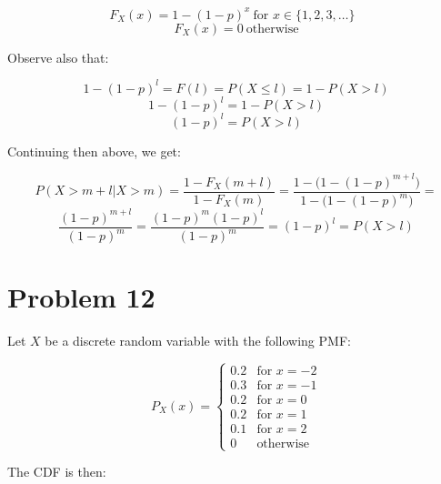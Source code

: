 \documentclass{article}
\begin{document}
\begin{equation*}
    F_{X}(x) = 1 - (1 - p)^{x} \ \mbox{for \(x \in \{1, 2, 3, \dots\}\)  }
\end{equation*}
\begin{equation*}
    F_{X}(x) = 0 \ \mbox{otherwise}
\end{equation*}

Observe also that:

\begin{equation*}
    1 - (1 - p)^{l} = F(l) = P(X \leq l) = 1 - P(X > l)
\end{equation*}
\begin{equation*}
    1 - (1 - p)^{l} = 1 - P(X > l)
\end{equation*}
\begin{equation*}
    (1 - p)^{l} = P(X > l)
\end{equation*}

Continuing then above, we get:

\begin{equation*}
    P(X > m + l | X > m) = \frac{1 - F_{X}(m + l)}{1 - F_{X}(m)} = \frac{1 - \Big(1 - (1 - p)^{m+l}\Big)}{1 - \Big(1 - (1 - p)^{m}\Big)} =
\end{equation*}
\begin{equation*}
    \frac{(1 - p)^{m+l}}{(1 - p)^{m}} = \frac{(1 - p)^{m}(1 - p)^{l}}{(1 - p)^{m}} = (1 - p)^{l} = P(X > l)
\end{equation*}
\section*{Problem 12}

Let \(X\) be a discrete random variable with the following PMF:

\begin{equation*}
    P_{X}(x) = 
    \begin{cases}
        0.2  & \mbox{for \(x = -2\)} \\
        0.3  & \mbox{for \(x = -1\)} \\
        0.2  & \mbox{for \(x = 0\)} \\
        0.2 & \mbox{for \(x = 1\)} \\
        0.1 & \mbox{for \(x = 2\)} \\
        0 & \mbox{otherwise}
    \end{cases}
\end{equation*}

The CDF is then:
\end{document}
